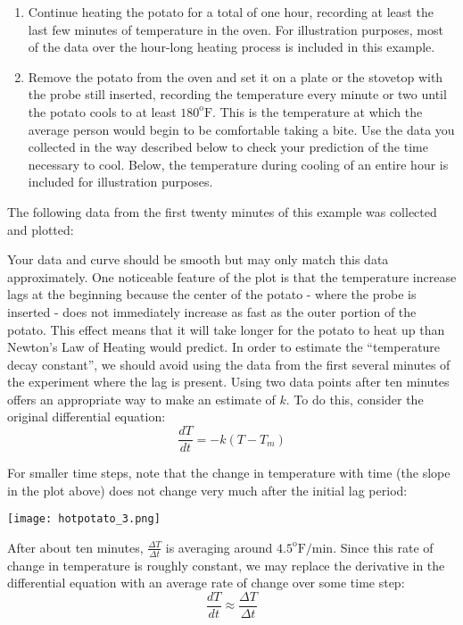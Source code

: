 \documentclass{ximera}
\begin{document}
\begin{enumerate}
\item Continue heating the potato for a total of one hour, recording at least the last few minutes of temperature in the oven.  For illustration purposes, most of the data over the hour-long heating process is included in this example.
\item Remove the potato from the oven and set it on a plate or the stovetop with the probe still inserted, recording the temperature every minute or two until the potato cools to at least $180^{\text{o}}\text{F}$. This is the temperature at which the average person would begin to be comfortable taking a bite.  Use the data you collected in the way described below to check your prediction of the time necessary to cool.  Below, the temperature during cooling of an entire hour is included for illustration purposes.
\end{enumerate}
 
The following data from the first twenty minutes of this example was collected and plotted:
 
\begin{center} 
\end{center}
 
Your data and curve should be smooth but may only match this data approximately.  One noticeable feature of the plot is that the temperature increase lags at the beginning because the center of the potato - where the probe is inserted - does not immediately increase as fast as the outer portion of the potato.  This effect means that it will take longer for the potato to heat up than Newton's Law of Heating would predict.  In order to estimate the ``temperature decay constant'', we should avoid using the data from the first several minutes of the experiment where the lag is present.  Using two data points after ten minutes offers an appropriate way to make an estimate of $k$.  To do this, consider the original differential equation:
\[
\frac{dT}{dt}=-k(T-T_m)
\]
 
For smaller time steps, note that the change in temperature with time (the slope in the plot above) does not change very much after the initial lag period:
 
\begin{image}
\texttt{[image: hotpotato\_3.png]}
\end{image}
 
After about ten minutes, $\frac{\Delta T}{\Delta t}$ is averaging around $4.5^{\text{o}}\text{F}/\text{min}$. Since this rate of change in temperature is roughly constant, we may replace the derivative in the differential equation with an average rate of change over some time step:
\[
\frac{dT}{dt}\approx \frac{\Delta T}{\Delta t}
\]
 
\end{document}
